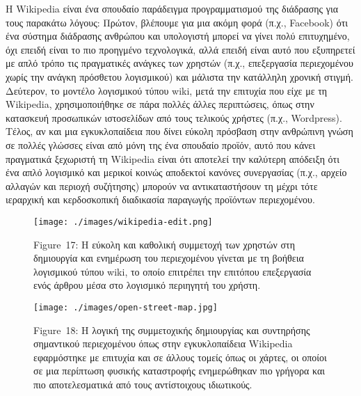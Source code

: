 \documentclass[
]{article}
\begin{document}
H Wikipedia είναι ένα σπουδαίο παράδειγμα προγραμματισμού της διάδρασης
για τους παρακάτω λόγους: Πρώτον, βλέπουμε για μια ακόμη φορά (π.χ.,
Facebook) ότι ένα σύστημα διάδρασης ανθρώπου και υπολογιστή μπορεί να
γίνει πολύ επιτυχημένο, όχι επειδή είναι το πιο προηγμένο τεχνολογικά,
αλλά επειδή είναι αυτό που εξυπηρετεί με απλό τρόπο τις πραγματικές
ανάγκες των χρηστών (π.χ., επεξεργασία περιεχομένου χωρίς την ανάγκη
πρόσθετου λογισμικού) και μάλιστα την κατάλληλη χρονική στιγμή.
Δεύτερον, το μοντέλο λογισμικού τύπου wiki, μετά την επιτυχία που είχε
με τη Wikipedia, χρησιμοποιήθηκε σε πάρα πολλές άλλες περιπτώσεις, όπως
στην κατασκευή προσωπικών ιστοσελίδων από τους τελικούς χρήστες (π.χ.,
Wordpress). Τέλος, αν και μια εγκυκλοπαίδεια που δίνει εύκολη πρόσβαση
στην ανθρώπινη γνώση σε πολλές γλώσσες είναι από μόνη της ένα σπουδαίο
προϊόν, αυτό που κάνει πραγματικά ξεχωριστή τη Wikipedia είναι ότι
αποτελεί την καλύτερη απόδειξη ότι ένα απλό λογισμικό και μερικοί κοινώς
αποδεκτοί κανόνες συνεργασίας (π.χ., αρχείο αλλαγών και περιοχή
συζήτησης) μπορούν να αντικαταστήσουν τη μέχρι τότε ιεραρχική και
κερδοσκοπική διαδικασία παραγωγής προϊόντων περιεχομένου.

\leavevmode{}%
\begin{figure}
\hypertarget{fig:wikipedia-edit}{%
\centering
\texttt{[image: ./images/wikipedia-edit.png]}
\caption{Figure~17: Η εύκολη και καθολική συμμετοχή των χρηστών στη
δημιουργία και ενημέρωση του περιεχομένου γίνεται με τη βοήθεια
λογισμικού τύπου wiki, το οποίο επιτρέπει την επιτόπου επεξεργασία ενός
άρθρου μέσα στο λογισμικό περιηγητή του
χρήστη.}\label{fig:wikipedia-edit}
}
\end{figure}

\leavevmode{}%
\begin{figure}
\hypertarget{fig:open-street-map}{%
\centering
\texttt{[image: ./images/open-street-map.jpg]}
\caption{Figure~18: Η λογική της συμμετοχικής δημιουργίας και συντηρήσης
σημαντικού περιεχομένου όπως στην εγκυκλοπαίδεια Wikipedia εφαρμόστηκε
με επιτυχία και σε άλλους τομείς όπως οι χάρτες, οι οποίοι σε μια
περίπτωση φυσικής καταστροφής ενημερώθηκαν πιο γρήγορα και πιο
αποτελεσματικά από τους αντίστοιχους
ιδιωτικούς.}\label{fig:open-street-map}
}
\end{figure}
\end{document}
